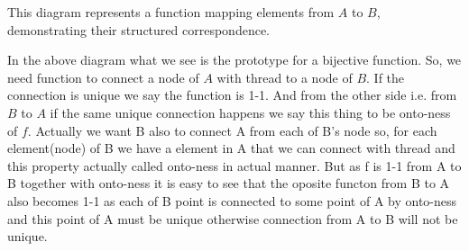 \documentclass{article}
\begin{document}
This diagram represents a function mapping elements from \( A \) to \( B \), demonstrating their structured correspondence.

In the above diagram what we see is the prototype for a bijective function. So, we need function to connect a node of $A$ with thread to a node of $B$. If the connection is unique we say the function is 1-1. And from the other side i.e. from $B$ to $A$ if the same unique connection happens we say this thing to be onto-ness of $f$. Actually we want B also to connect A from each of B's node so, for each element(node) of B we have a element in A that we can connect with thread and this property actually called onto-ness in actual manner. But as f is 1-1 from A to B together with onto-ness it is easy to see that the oposite functon from B to A also becomes 1-1 as each of B point is connected to some point of  A by onto-ness and this point of A must be unique otherwise connection from A to B will not be unique.
\end{document}
